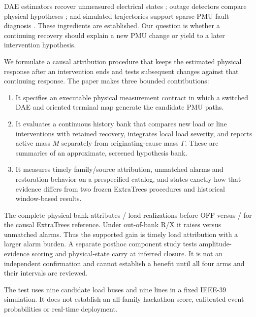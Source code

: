 DAE estimators recover unmeasured electrical states
\cite{katanic2024recursive}; outage detectors compare physical hypotheses
\cite{chen2016quickest,rovatsos2017outage}; and simulated trajectories
support sparse-PMU fault diagnosis \cite{warner2023highfidelity}. These
ingredients are established. Our question is whether a continuing recovery
should explain a new PMU change or yield to a later intervention hypothesis.

We formulate a causal attribution procedure that keeps the estimated
physical response after an intervention ends and tests subsequent changes
against that continuing response. The paper makes three bounded contributions:
\begin{enumerate}
\item It specifies an executable physical measurement contract in which a
switched DAE and oriented terminal map generate the candidate PMU paths.
\item It evaluates a continuous history bank that compares new load or line
interventions with retained recovery, integrates local load severity, and
reports active mass $M$ separately from originating-cause mass $\Gamma$.
These are summaries of an approximate, screened hypothesis bank.
\item It measures timely family/source attribution, unmatched alarms and
restoration behavior on a prespecified catalog, and states exactly how that
evidence differs from two frozen ExtraTrees procedures and historical
window-based results.
\end{enumerate}
The complete physical bank attributes
\ReaderPhysicalLoad{}/\ReaderFamilyTotal{} load realizations before OFF
versus \ReaderETLoad{}/\ReaderFamilyTotal{} for the causal ExtraTrees
reference. Under out-of-bank R/X it raises \ReaderPhysicalOutsideExtras{}
versus \ReaderETOutsideExtras{} unmatched alarms. Thus the supported gain
is timely load attribution with a larger alarm burden. A separate posthoc component study tests amplitude-evidence scoring and
physical-state carry at inferred closure. It is not an independent confirmation
and cannot establish a benefit until all four arms and their intervals are
reviewed.

The test uses nine candidate load buses and nine lines in a fixed IEEE-39
simulation. It does not establish an all-family hackathon score, calibrated
event probabilities or real-time deployment.
